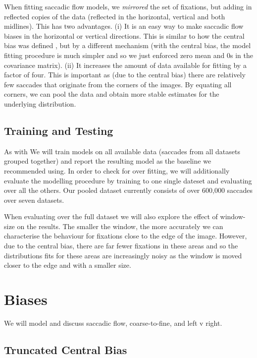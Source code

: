 \documentclass[a4paper, onecolumn, oneside, 11pt]{article}
\begin{document}
When fitting saccadic flow models,  we \textit{mirrored} the set of fixations, but adding in reflected copies of the data (reflected in the horizontal, vertical and both midlines). This has two advantages. (i) It is an easy way to make saccadic flow biases in the horizontal or vertical directions. This is similar to how the central bias was defined \cite{clarke-tatler2014}, but by a different mechanism (with the central bias, the model fitting procedure is much simpler and so we just enforced zero mean and 0s in the covariance matrix). (ii) It increases the amount of data available for fitting by a factor of four. This is important as (due to the central bias) there are relatively few saccades that originate from the corners of the images. By equating all corners, we can pool the data and obtain more stable estimates for the underlying distribution. 


\subsection{Training and Testing}

As with \cite{clarke-tatler2014} We will train models on all available data (saccades from all datasets grouped together) and report the resulting model as the baseline we recommended using. In order to check for over fitting, we will additionally evaluate the modelling procedure by training to one single dateset and evaluating over all the others. Our pooled dataset currently consists of over 600,000 saccades over seven datasets. 

When evaluating over the full dataset we will also explore the effect of window-size on the results. The smaller the window, the more accurately we can characterise the behaviour for fixations close to the edge of the image. However, due to the central bias, there are far fewer fixations in these areas and so the distributions fits for these areas are increasingly noisy as the window is moved closer to the edge and with a smaller size. 


\section{Biases}

We will model and discuss saccadic flow, coarse-to-fine, and left v right. 

\subsection{Truncated Central Bias}
\end{document}
